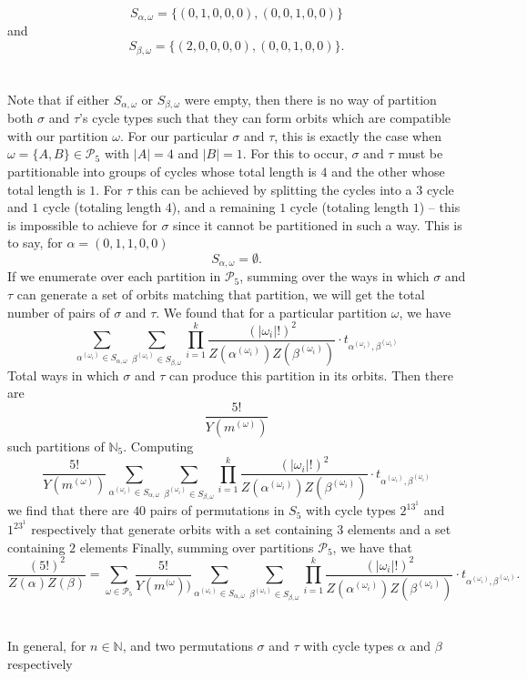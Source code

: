 \[
S_{\alpha,\omega} = \{(0,1,0,0,0), (0,0,1,0,0)\}
\]
and 
\[
S_{\beta,\omega} = \{(2,0,0,0,0), (0, 0, 1,0,0)\}.
\]
\\\\Note that if either $S_{\alpha,\omega}$ or $S_{\beta,\omega}$ were empty, then there is no way of partition both $\sigma$ and $\tau$'s cycle types such that they can form orbits which are compatible with our partition $\omega$. For our particular $\sigma$ and $\tau$, this is exactly the case when $\omega = \{A,B\}\in\mathcal{P}_5$ with $|A| = 4$ and $|B| = 1$. For this to occur, $\sigma$ and $\tau$ must be partitionable into groups of cycles whose total length is $4$ and the other whose total length is $1$. For $\tau$ this can be achieved by splitting the cycles into a $3$ cycle and $1$ cycle (totaling length $4$), and a remaining $1$ cycle (totaling length $1$) -- this is impossible to achieve for $\sigma$ since it cannot be partitioned in such a way. This is to say, for $\alpha = (0,1,1,0,0)$
\[
    S_{\alpha,\omega} = \emptyset.
\]
If we enumerate over each partition in $\mathcal{P}_5$, summing over the ways in which $\sigma$ and $\tau$ can generate a set of orbits matching that partition, we will get the total number of pairs of $\sigma$ and $\tau$. We found that for a particular partition $\omega$, we have 
\[
\sum_{\alpha^{(\omega_i)}\in S_{\alpha,\omega}}\sum_{\beta^{(\omega_i)}\in S_{\beta,\omega}}\prod_{i=1}^k
{\frac{(|\omega_i|!)^2}{Z(\alpha^{(\omega_i)})Z(\beta^{(\omega_i)})}}\cdot t_{\alpha^{(\omega_i)},\beta^{(\omega_i)}}\]
Total ways in which $\sigma$ and $\tau$ can produce this partition in its orbits. Then there are 
\[
\frac{5!}{Y(m^{(\omega)})}
\]
such partitions of $\mathbb{N}_5$. Computing 
\[
\frac{5!}{Y(m^{(\omega)})}\sum_{\alpha^{(\omega_i)}\in S_{\alpha,\omega}}\sum_{\beta^{(\omega_i)}\in S_{\beta,\omega}}\prod_{i=1}^k
{\frac{(|\omega_i|!)^2}{Z(\alpha^{(\omega_i)})Z(\beta^{(\omega_i)})}}\cdot t_{\alpha^{(\omega_i)},\beta^{(\omega_i)}}
\]
we find that there are $40$ pairs of permutations in $S_5$ with cycle types $2^13^1$ and $1^23^1$ respectively that generate orbits with a set containing $3$ elements and a set containing $2$ elements
Finally, summing over partitions $\mathcal{P}_5$, we have that 
\[
    \frac{(5!)^2}{Z(\alpha)Z(\beta)} = \sum_{\omega\in\mathcal{P}_5}\frac{5!}{Y(m^{(\omega}))}\sum_{\alpha^{(\omega_i)}\in S_{\alpha,\omega}}\sum_{\beta^{(\omega_i)}\in S_{\beta,\omega}}\prod_{i=1}^k
{\frac{(|\omega_i|!)^2}{Z(\alpha^{(\omega_i)})Z(\beta^{(\omega_i)})}}\cdot t_{\alpha^{(\omega_i)},\beta^{(\omega_i)}}.
\]
\\\\In general, for $n\in\mathbb{N}$, and two permutations $\sigma$ and $\tau$ with cycle types $\alpha$ and $\beta$ respectively

